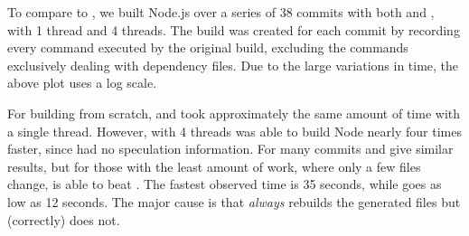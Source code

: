 


\vspace{3mm}

To compare to \Rattle, we built Node.js over a series of 38 commits with both \Make and \Rattle, with 1 thread and 4 threads. The \Rattle build was created for each commit by recording every command executed by the original build, excluding the commands exclusively dealing with dependency files. Due to the large variations in time, the above plot uses a log scale.

For building from scratch, \Make and \Rattle took approximately the same amount of time with a single thread. However, with 4 threads \Make was able to build Node nearly four times faster, since \Rattle had no speculation information. For many commits \Rattle and \Make give similar results, but for those with the least amount of work, where only a few files change, \Rattle is able to beat \Make. The fastest observed \Make time is 35 seconds, while \Rattle goes as low as 12 seconds. The major cause is that \Make \emph{always} rebuilds the generated files but \Rattle (correctly) does not.


